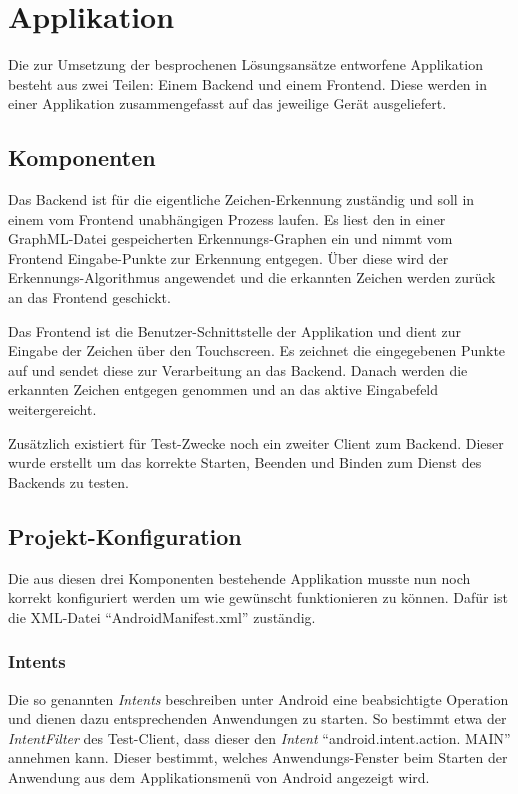 \chapter{Applikation}

Die zur Umsetzung der besprochenen Lösungsansätze entworfene Applikation besteht aus zwei Teilen: Einem Backend und einem Frontend. Diese werden in einer Applikation zusammengefasst auf das jeweilige Gerät ausgeliefert.

\section{Komponenten}

Das Backend ist für die eigentliche Zeichen-Erkennung zuständig und soll in einem vom Frontend unabhängigen Prozess laufen. Es liest den in einer GraphML-Datei gespeicherten Erkennungs-Graphen ein und nimmt vom Frontend Eingabe-Punkte zur Erkennung entgegen. Über diese wird der Erkennungs-Algorithmus angewendet und die erkannten Zeichen werden zurück an das Frontend geschickt.

Das Frontend ist die Benutzer-Schnittstelle der Applikation und dient zur Eingabe der Zeichen über den Touchscreen. Es zeichnet die eingegebenen Punkte auf und sendet diese zur Verarbeitung an das Backend. Danach werden die erkannten Zeichen entgegen genommen und an das aktive Eingabefeld weitergereicht.

Zusätzlich existiert für Test-Zwecke noch ein zweiter Client zum Backend. Dieser wurde erstellt um das korrekte Starten, Beenden und Binden zum Dienst des Backends zu testen.

\section{Projekt-Konfiguration}

Die aus diesen drei Komponenten bestehende Applikation musste nun noch korrekt konfiguriert werden um wie gewünscht funktionieren zu können. Dafür ist die XML-Datei ``AndroidManifest.xml'' zuständig.

\subsection{Intents}

Die so genannten \emph{Intents} beschreiben unter Android eine beabsichtigte Operation und dienen dazu entsprechenden Anwendungen zu starten. So bestimmt etwa der \emph{IntentFilter} des Test-Client, dass dieser den \emph{Intent} ``android.intent.action. MAIN'' annehmen kann. Dieser bestimmt, welches Anwendungs-Fenster beim Starten der Anwendung aus dem Applikationsmenü von Android angezeigt wird.

